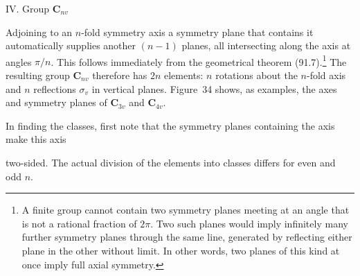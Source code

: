 \medskip
\noindent IV. Group $\boldsymbol{C}_{nv}$

Adjoining to an $n$-fold symmetry axis a symmetry plane that contains it automatically supplies another $(n-1)$ planes, all intersecting along the axis at angles $\pi/n$. This follows immediately from the geometrical theorem (91.7).\footnote{A finite group cannot contain two symmetry planes meeting at an angle that is not a rational fraction of $2\pi$. Two such planes would imply infinitely many further symmetry planes through the same line, generated by reflecting either plane in the other without limit. In other words, two planes of this kind at once imply full axial symmetry.} The resulting group $\boldsymbol{C}_{nv}$ therefore has $2n$ elements: $n$ rotations about the $n$-fold axis and $n$ reflections $\sigma_v$ in vertical planes. Figure~34 shows, as examples, the axes and symmetry planes of $\boldsymbol{C}_{3v}$ and $\boldsymbol{C}_{4v}$.

In finding the classes, first note that the symmetry planes containing the axis make this axis

two-sided. The actual division of the elements into classes differs for even and odd $n$.

